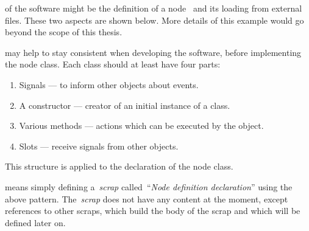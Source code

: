 \documentclass[%
    a4paper,    %
    justified,  %
    nobib,      %
    openany     %
]{tufte-book}
\begin{document}
 of the software might
be the definition of a node~ and its loading from external files. These two aspects are shown
below. More details of this example would go beyond the scope of this thesis.

 may help to stay
consistent when developing the software, before implementing the node class.
Each class should at least have four parts:
\begin{enumerate}
  \item Signals --- to inform other objects about events.
  \item A constructor --- creator of an initial instance of a class.
  \item Various methods --- actions which can be executed by the object.
  \item Slots --- receive signals from other objects.
\end{enumerate}
This structure is applied to the declaration of the node class.

\newpage{}

 means simply defining a~\emph{scrap}
called~\enquote{\emph{Node definition declaration}} using the above pattern.
The~\emph{scrap} does not have any content at the moment, except references to
other scraps, which build the body of the scrap and which will be defined later
on.
\end{document}
